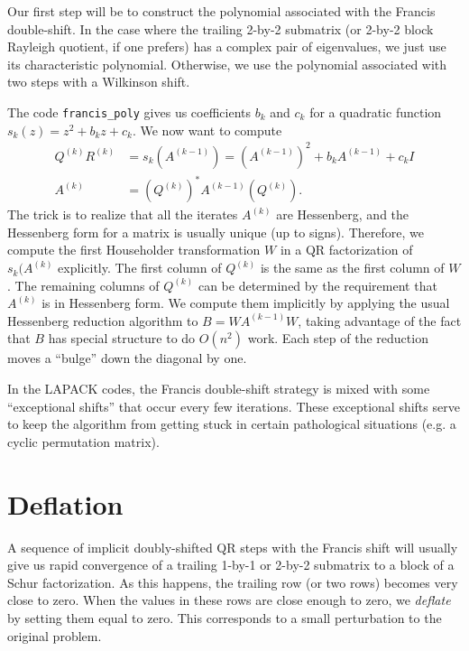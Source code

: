 \documentclass[12pt, leqno]{article} %
\begin{document}
Our first step will be to construct the polynomial associated with the
Francis double-shift.  In the case where the trailing 2-by-2 submatrix
(or 2-by-2 block Rayleigh quotient, if one prefers) has a complex pair
of eigenvalues, we just use its characteristic polynomial.  Otherwise,
we use the polynomial associated with two steps with a Wilkinson shift.



The code {\tt francis\_poly} gives us coefficients $b_k$ and $c_k$ for a
quadratic function $s_k(z) = z^2 + b_k z + c_k$.  We now want to compute
\begin{align*}
  Q^{(k)} R^{(k)} &= s_k(A^{(k-1)}) = (A^{(k-1)})^2 + b_k A^{(k-1)} + c_k I \\
  A^{(k)}        &= (Q^{(k)})^* A^{(k-1)} (Q^{(k)}).
\end{align*}
The trick is to realize that all the iterates $A^{(k)}$ are Hessenberg,
and the Hessenberg form for a matrix is usually unique (up to signs).
Therefore, we compute the first Householder transformation $W$ in a
QR factorization of $s_k(A^{(k)}$ explicitly.  The first column of $Q^{(k)}$
is the same as the first column of $W$.  The remaining columns of $Q^{(k)}$
can be determined by the requirement that $A^{(k)}$ is in Hessenberg form.
We compute them implicitly by applying the usual Hessenberg reduction algorithm
to $B = WA^{(k-1)}W$, taking advantage of the fact that $B$ has special
structure to do $O(n^2)$ work.  Each step of the reduction moves a ``bulge''
down the diagonal by one.



In the LAPACK codes, the Francis double-shift strategy is mixed with
some ``exceptional shifts'' that occur every few iterations.
These exceptional shifts serve to keep the algorithm from getting
stuck in certain pathological situations (e.g. a cyclic permutation
matrix).

\section{Deflation}

A sequence of implicit doubly-shifted QR steps with the Francis shift
will usually give us rapid convergence of a trailing 1-by-1 or 2-by-2
submatrix to a block of a Schur factorization.  As this happens,
the trailing row (or two rows) becomes very close to zero.  When the
values in these rows are close enough to zero, we {\em deflate} by
setting them equal to zero.  This corresponds to a small perturbation
to the original problem.
\end{document}
